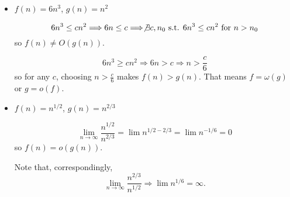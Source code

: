 \documentclass{article}
\begin{document}
\begin{itemize}

\vspace{1pc}
\item $f(n) = 6n^3$, $g(n) = n^2$

\[
  6n^3 \le cn^2
\Longrightarrow
  6n \le c
\Longrightarrow
  \not\exists c, n_0 \mbox{ s.t. } 6n^3 \le cn^2 \mbox{ for } n>n_0
\]
so $f(n)\ne O(g(n))$.

\[
  6n^3 \ge cn^2
\Longrightarrow
  6n > c
\Longrightarrow
  n > \frac{c}{6}
\]
so for any $c$, choosing $n > \frac{c}{6}$ makes $f(n) > g(n)$.
That means $f=\omega(g)$ or $g = o(f)$.

\vspace{1pc}
\item $f(n) = n^{1/2}$, $g(n) = n^{2/3}$

\[
  \lim_{n\rightarrow\infty}\frac{n^{1/2}}{n^{2/3}}
=
  \lim n^{1/2-2/3}
=
  \lim n^{-1/6}
=
  0
\]
so $f(n)=o(g(n))$.

Note that, correspondingly,
\[
  \lim_{n\rightarrow\infty}\frac{n^{2/3}}{n^{1/2}}
\Longrightarrow
  \lim n^{1/6} = \infty.
\]


\end{itemize}
\end{document}
